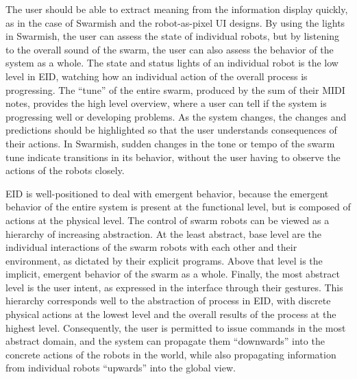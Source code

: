 \documentclass[]{article}
\begin{document}
The user should be able to extract meaning from the information display quickly, as in the case of Swarmish and the robot-as-pixel UI designs.
By using the lights in Swarmish, the user can assess the state of individual robots, but by listening to the overall sound of the swarm, the user can also assess the behavior of the system as a whole.
The state and status lights of an individual robot is the low level in EID, watching how an individual action of the overall process is progressing. 
The ``tune'' of the entire swarm, produced by the sum of their MIDI notes, provides the high level overview, where a user can tell if the system is progressing well or developing problems. 
As the system changes, the changes and predictions should be highlighted so that the user understands consequences of their actions. 
In Swarmish, sudden changes in the tone or tempo of the swarm tune indicate transitions in its behavior, without the user having to observe the actions of the robots closely. 

EID is well-positioned to deal with emergent behavior, because the emergent behavior of the entire system is present at the functional level, but is composed of actions at the physical level.  
The control of swarm robots can be viewed as a hierarchy of increasing abstraction. 
At the least abstract, base level are the individual interactions of the swarm robots with each other and their environment, as dictated by their explicit programs. 
Above that level is the implicit, emergent behavior of the swarm as a whole. 
Finally, the most abstract level is the user intent, as expressed in the interface through their gestures. 
This hierarchy corresponds well to the abstraction of process in EID, with discrete physical actions at the lowest level and the overall results of the process at the highest level. 
Consequently, the user is permitted to issue commands in the most abstract domain, and the system can propagate them ``downwards'' into the concrete actions of the robots in the world, while also propagating information from individual robots ``upwards'' into the global view. 
\end{document}
